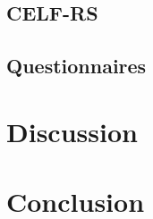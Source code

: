 \documentclass[a4paper,nobind]{templates/ociamthesis}
\begin{document}
\hypertarget{celf-rs-1}{%
\subsection{CELF-RS}\label{celf-rs-1}}

\hypertarget{questionnaires-1}{%
\subsection{Questionnaires}\label{questionnaires-1}}

\hypertarget{discussion}{%
\section{Discussion}\label{discussion}}

\hypertarget{conclusion}{%
\section{Conclusion}\label{conclusion}}

\clearpage
\end{document}
